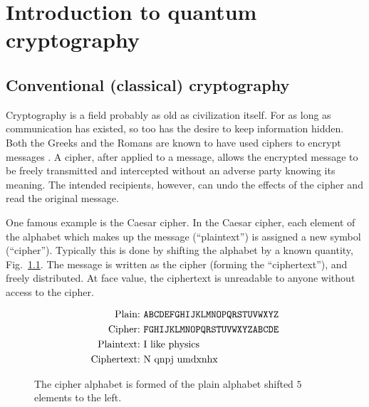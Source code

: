 \chapter{Introduction to quantum cryptography}\label{chapter:crypto_intro}

\section{Conventional (classical) cryptography}

Cryptography is a field probably as old as civilization itself. For as long as communication has existed, so too has the desire to keep information hidden. Both the Greeks and the Romans are known to have used ciphers to encrypt messages \cite{Singh1999}. A cipher, after applied to a message, allows the encrypted message to be freely transmitted and intercepted without an adverse party knowing its meaning. The intended recipients, however, can undo the effects of the cipher and read the original message. 

One famous example is the Caesar cipher. In the Caesar cipher, each element of the alphabet which makes up the message (``plaintext'') is assigned a new symbol (``cipher''). Typically this is done by shifting the alphabet by a known quantity, Fig.~\ref{fig:caesar}. The message is written as the cipher (forming the ``ciphertext''), and freely distributed. At face value, the ciphertext is unreadable to anyone without access to the cipher.

\begin{figure}[htp]
\centering
\captionsetup{width=0.8\linewidth}
\begin{framed}
\begin{align*}
\text{Plain:} &\text{  \texttt{ABCDEFGHIJKLMNOPQRSTUVWXYZ}} \\
\text{Cipher:} &\text{  \texttt{FGHIJKLMNOPQRSTUVWXYZABCDE}} \\
\text{Plaintext:} &\text{  I like physics} \\
\text{Ciphertext:} &\text{  N qnpj umdxnhx}
\end{align*}
\end{framed}
\caption{\label{fig:caesar} The cipher alphabet is formed of the plain alphabet shifted $5$ elements to the left.}
\end{figure} %


